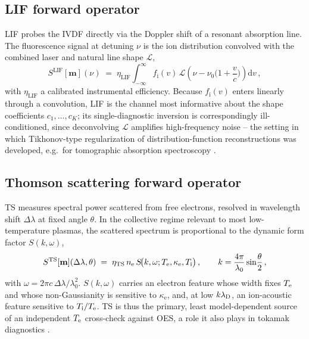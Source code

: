 \subsection{LIF forward operator}

LIF probes the IVDF directly via the Doppler shift of a resonant absorption line. The fluorescence signal at detuning $\nu$ is the ion distribution convolved with the combined laser and natural line shape $\mathcal L$,
\begin{equation}
S^{\mathrm{LIF}}[\mathbf m](\nu) \;=\; \eta_{\mathrm{LIF}}\int_{-\infty}^{\infty} f_{\mathrm i}(v)\, \mathcal L\!\left(\nu-\nu_{0}\Big(1+\frac{v}{c}\Big)\right)\mathrm dv \, , \label{eq:G-lif}
\end{equation}
with $\eta_{\mathrm{LIF}}$ a calibrated instrumental efficiency. Because $f_{\mathrm i}(v)$ enters linearly through a convolution, LIF is the channel most informative about the shape coefficients $c_{1},\dots,c_{K}$; its single-diagnostic inversion is correspondingly ill-conditioned, since deconvolving $\mathcal L$ amplifies high-frequency noise -- the setting in which Tikhonov-type regularization of distribution-function reconstructions was developed, e.g.\ for tomographic absorption spectroscopy \cite{ref0677}.

\subsection{Thomson scattering forward operator}

TS measures spectral power scattered from free electrons, resolved in wavelength shift $\Delta\lambda$ at fixed angle $\theta$. In the collective regime relevant to most low-temperature plasmas, the scattered spectrum is proportional to the dynamic form factor $S(k,\omega)$,
\begin{equation}
S^{\mathrm{TS}}[\mathbf m](\Delta\lambda,\theta) \;=\; \eta_{\mathrm{TS}}\, n_{\mathrm{e}}\, S\!\big(k,\omega;T_{\mathrm{e}},\kappa_{\mathrm e},T_{\mathrm{i}}\big) \, ,\qquad k = \frac{4\pi}{\lambda_{0}}\sin\!\frac{\theta}{2} \, , \label{eq:G-ts}
\end{equation}
with $\omega=2\pi c\,\Delta\lambda/\lambda_{0}^{2}$. $S(k,\omega)$ carries an electron feature whose width fixes $T_{\mathrm{e}}$ and whose non-Gaussianity is sensitive to $\kappa_{\mathrm e}$, and, at low $k\lambda_{\mathrm{D}}$, an ion-acoustic feature sensitive to $T_{\mathrm{i}}/T_{\mathrm{e}}$. TS is thus the primary, least model-dependent source of an independent $T_{\mathrm{e}}$ cross-check against OES, a role it also plays in tokamak diagnostics \cite{ref0683,ref0684}.

